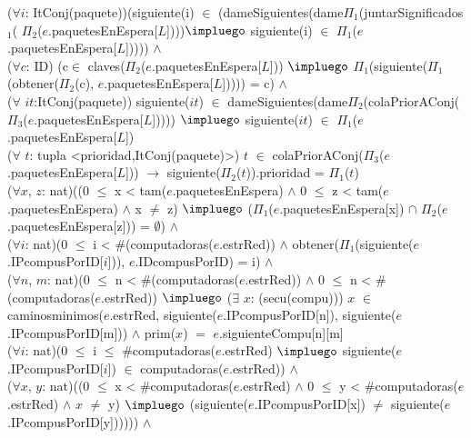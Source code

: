 \begin{Representacion}
{			($\forall i$: ItConj(paquete))(siguiente(i) $\in$ (dameSiguientes(dame$\Pi_1$(juntarSignificados$_1$( $\Pi_2$($e$.paquetesEnEspera[$L$])))$\impluego$ siguiente(i) $\in$ $\Pi_1$($e$.paquetesEnEspera[$L$])))) $\land$ \\

			($\forall c$: ID) (c$\in$ claves($\Pi_2$($e$.paquetesEnEspera[$L$])) $\impluego$ $\Pi_1$(siguiente($\Pi_1$(obtener($\Pi_2$(c), $e$.paquetesEnEspera[$L$])))) = c) $\land$ \\

      ($\forall$ $it$:ItConj(paquete)) siguiente($it$) $\in$ dameSiguientes(dame$\Pi_2$(colaPriorAConj($\Pi_3$($e$.paquetesEnEspera[$L$])))) $\impluego$ siguiente($it$) $\in$ $\Pi_1$($e$.paquetesEnEspera[$L$]) \\

			($\forall$ $t$: tupla <prioridad,ItConj(paquete)>) $t$ $\in$ colaPriorAConj($\Pi_3$($e$.paquetesEnEspera[$L$])) $\rightarrow$ siguiente($\Pi_2$($t$)).prioridad = $\Pi_1$($t$) \\

    ($\forall x$, $z$: nat)((0 $\leq$ x < tam($e$.paquetesEnEspera) $\land$ 0 $\leq$ z < tam($e$.paquetesEnEspera) $\land$ x $\neq$ z) $\impluego$ ($\Pi_1$($e$.paquetesEnEspera[x]) $\cap$ $\Pi_2$($e$.paquetesEnEspera[z])) = $\emptyset$) $\land$ \\

		($\forall i$: nat)(0 $\leq$ i < \#(computadoras($e$.estrRed)) $\land$ obtener($\Pi_1$(siguiente($e$.IPcompusPorID[$i$])), $e$.IDcompusPorID) = i) $\land$ \\

		($\forall n$, $m$: nat)(0 $\leq$ n < \#(computadoras($e$.estrRed)) $\land$ 0 $\leq$ n < \#(computadoras($e$.estrRed)) $\impluego$ ($\exists$ $x$: (secu(compu))) $x$ $\in$ caminosminimos($e$.estrRed, siguiente($e$.IPcompusPorID[n]), siguiente($e$.IPcompusPorID[m])) $\land$ prim($x$) $=$ $e$.siguienteCompu[n][m] \\

    ($\forall i$: nat)(0 $\leq$ i $\leq$ \#computadoras($e$.estrRed) $\impluego$ siguiente($e$.IPcompusPorID[$i$]) $\in$ computadoras($e$.estrRed)) $\land$ \\

    ($\forall x$, $y$: nat)((0 $\leq$ x < \#computadoras($e$.estrRed) $\land$ 0 $\leq$ y < \#computadoras($e$.estrRed) $\land$ $x$ $\neq$ y) $\impluego$ (siguiente($e$.IPcompusPorID[x]) $\neq$ siguiente($e$.IPcompusPorID[y]))))) $\land$ \\

}
\end{Representacion}
